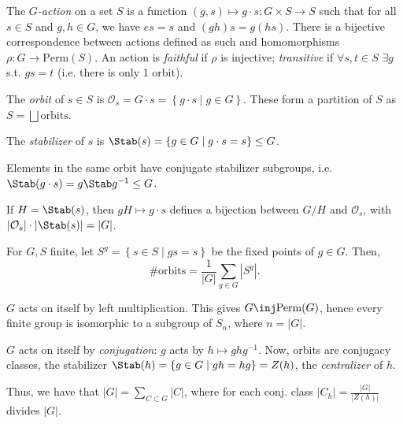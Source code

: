 \documentclass{notes}
\begin{document}
\begin{defn}
    The  \emph{$G$-action} on a set $S$ is a function $(g,s)\mapsto g\cdot s\colon G\times S\to S$ such that for all $s \in S$ and $g,h\in G$, we have $es=s$ and $(gh)s=g(hs)$. There is a bijective correspondence between actions defined as such and homomorphisms $\rho\colon G \to \text{Perm}(S) $. An action is \emph{faithful} if $\rho$ is injective; \emph{transitive} if $\forall s,t\in S$ $\exists g$ s.t. $gs=t$ (i.e. there is only 1 orbit). 
\end{defn}

\begin{defn}
    The \emph{orbit} of $s \in S$ is $\mathcal{O} _s=G\cdot s=\left\{ g\cdot s\mid  g\in G \right\} $. These form a partition of $S$ as $S=\bigsqcup\text{orbits}$.
\end{defn}

\begin{defn}
    The \emph{stabilizer} of $s$ is $\Stab (s)=\left\{ g\in G\mid  g\cdot s=s \right\} \le G$.
\end{defn}

\begin{theorem}
    Elements in the same orbit have conjugate stabilizer subgroups, i.e. $\Stab (g\cdot s)=g\Stab g^{-1}\le G$.
\end{theorem}

\begin{theorem}
    If $H=\Stab (s)$, then $gH\mapsto g\cdot s$ defines a bijection between $G/H$ and $\mathcal{O} _s$, with $|\mathcal{O} _s|\cdot |\Stab (s)|=|G|$.
\end{theorem}

\begin{lemma}[Burnside]
    For $G,S$ finite, let $S^g=\left\{ s \in S\mid  gs=s \right\} $ be the fixed points of $g\in G$. Then,
    \[
    \text{\# orbits} = \frac{1}{|G|}\sum_{g\in G} {|S^g|} 
    .\] 
\end{lemma}

\begin{example}
    $G$ acts on itself by left multiplication. This gives $G\inj \text{Perm}(G)$, hence every finite group is isomorphic to a subgroup of $S_n$, where $n=|G|$.
\end{example}

\begin{theorem}
    $G$ acts on itself by \emph{conjugation}: $g$ acts by $h\mapsto ghg^{-1}$. Now, orbits are conjugacy classes, the stabilizer $\Stab (h)=\left\{ g\in G\mid  gh=hg \right\}=Z(h) $, the \emph{centralizer} of $h$.

    Thus, we have that $|G|=\sum_{C\subset G} {|C|}$, where for each conj. class $|C_h|=\frac{|G|}{|Z(h)|}$ divides $|G|$.
\end{theorem}
\end{document}
